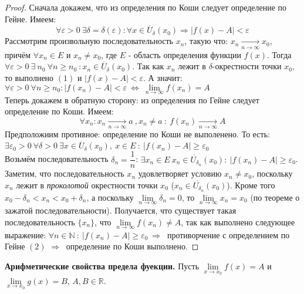 \documentclass[12pt]{article}
\begin{document}
\begin{proof}
    Сначала докажем, что из определения по Коши следует определение по Гейне. Имеем: 
    \begin{equation}
        \forall \varepsilon > 0 \ \exists \delta = \delta(\varepsilon) : \forall x \in \mathring{U_\delta}(x_0) \Rightarrow |f(x) - A| < \varepsilon
    \end{equation}
    Рассмотрим произвольную последовательность $x_n$, такую что:  $x_n \xrightarrow[n \to \infty]{} x_0$, причём $\forall x_n \in E$ и $x_n \neq x_0$, где $E$ - область определения функции $f(x)$. Тогда $\forall \varepsilon > 0 \ \exists \ n_0 \ \forall n \geq n_0 \ :x_n \in \mathring{U_\delta}(x_0)$. Так как $x_n$ лежит в $\delta$-окрестности точки $x_0$, то выполнено $(1)$ и $|f(x) - A| < \varepsilon$. А значит: $\forall \varepsilon > 0 \ \forall n \geq n_0 : |f(x_n) - A| < \varepsilon \ \Leftrightarrow \ \lim\limits_{n \to \infty} f(x_n) = A $ \\
    Теперь докажем в обратную сторону: из определения по Гейне следует определение по Коши. Имеем:
    \begin{equation}
        \forall {x_n}: x_n \xrightarrow[n \to \infty]{} a \ ,x_n \neq a \ : \ f(x_n) \xrightarrow[n \to \infty]{}A
    \end{equation}
    Предположиим противное: определение по Коши не выполенено. То есть: \\
    $\exists \varepsilon_0 > 0 \ \forall \delta > 0 \ \exists x \in \mathring{U_\delta}(x_0), \ x \in E \ : \ |f(x_n) - A| \geq \varepsilon_0$ \\
    Возьмём последовательность $\delta_n = \dfrac1n$: $\exists x_n \in E \ x_n \in \mathring{U_{\delta_n}}(x_0): \ |f(x_n) - A| \geq \varepsilon_0$. \\
    Заметим, что последовательность $x_n$ удовлетворяет условию $x_n \neq x_0$, поскольку $x_n$ лежит в \textit{проколотой} окрестности точки $x_0$ ($x_n \in \mathring{U_{\delta_n}}(x_0)$). Кроме того $x_0 - \delta_n < x_n < x_0 + \delta_n$, а поскольку $\lim\limits_{n \to \infty} \delta_n = 0$, то $\lim\limits_{n \to \infty} x_n = x_0$ (по теореме о зажатой последовательности). Получается, что существует такая последовательность $\{x_n\}$, что $\lim\limits_{n \to \infty} f(x_n) \neq A$, так как выполнено следующее выражение: $\forall n \in \mathbb{N} \ : \  |f(x_n) - A| \geq \varepsilon_0 \ \Rightarrow \ $ противорчение с определением по Гейне $(2)$ $\Rightarrow \ $ определение по Коши выполнено.
\end{proof}
\textbf{Арифметические свойства предела фуекции.} Пусть $\lim\limits_{x \to x_0} f(x) = A$ и $\lim\limits_{x \to x_0} g(x) = B$, $A, B \in \mathbb{R}$.
\end{document}
